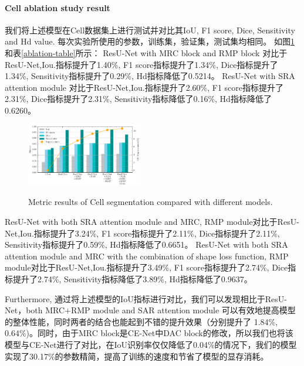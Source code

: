 \documentclass{ieeeaccess}
\begin{document}
  \paragraph{Cell ablation study result}
  我们将上述模型在Cell数据集上进行测试并对比其IoU, F1 score, Dice, Sensitivity and Hd value. 每次实验所使用的参数，训练集，验证集，测试集均相同。
  如图\ref{fig:cell_comparison}和表\ref{ablation-table}所示：
  ResU-Net with MRC block and RMP block 对比于ResU-Net,Iou.指标提升了1.40\%, F1 score指标提升了1.34\%, Dice指标提升了1.34\%, Sensitivity指标提升了0.29\%, Hd指标降低了0.5214。
  ResU-Net with SRA attention module 对比于ResU-Net,Iou.指标提升了2.60\%, F1 score指标提升了2.31\%, Dice指标提升了2.31\%, Sensitivity指标降低了0.16\%, Hd指标降低了0.6260。
  \begin{figure}[htbp]
    \begin{center}
    \includegraphics[width=0.45\textwidth]{figure/cell_comparison.pdf}
    \vspace{-2mm}
    \caption{Metric results of Cell segmentation compared with different models.} 
    \vspace{-2mm}
    \label{fig:cell_comparison}
    \end{center}
    \vspace{-0.35cm}
  \end{figure}
  ResU-Net with both SRA attention module and MRC, RMP module对比于ResU-Net,Iou.指标提升了3.24\%, F1 score指标提升了2.11\%, Dice指标提升了2.11\%, Sensitivity指标提升了0.59\%, Hd指标降低了0.6651。
  ResU-Net with both SRA attention module and MRC with the combination of shape loss function, 
  RMP module对比于ResU-Net,Iou.指标提升了3.49\%, F1 score指标提升了2.74\%, Dice指标提升了2.74\%, Sensitivity指标降低了3.89\%, Hd指标降低了0.9637。
  
  Furthermore, 通过将上述模型的IoU指标进行对比，我们可以发现相比于ResU-Net，both MRC+RMP module and SAR attention module 可以有效地提高模型的整体性能，同时两者的结合也能起到不错的提升效果（分别提升了
  1.84\%, 0.64\%)。同时，由于MRC block是CE-Net中DAC block的修改，所以我们也将该模型与CE-Net进行了对比，在IoU识别率仅仅降低了0.04\%的情况下，我们的模型实现了30.17\%的参数精简，提高了训练的速度和节省了模型的显存消耗。
\end{document}
